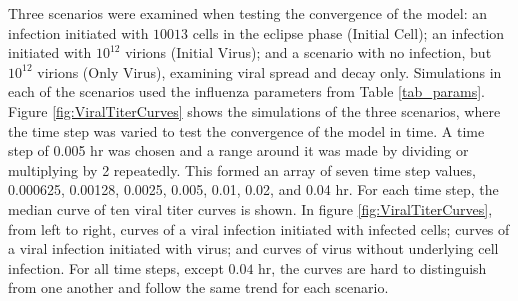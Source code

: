 Three scenarios were examined when testing the convergence of the model: an infection initiated with $10013$ cells in the eclipse phase (Initial Cell); an infection initiated with $10^{12}$ virions (Initial Virus); and a scenario with no infection, but $10^{12}$ virions (Only Virus), examining viral spread and decay only. Simulations in each of the scenarios used the influenza parameters from Table \ref{tab_params}. Figure \ref{fig:ViralTiterCurves} shows the simulations of the three scenarios, where the time step was varied to test the convergence of the model in time. A time step of 0.005 hr was chosen and a range around it was made by dividing or multiplying by 2 repeatedly. This formed an array of seven time step values, 0.000625, 0.00128, 0.0025, 0.005, 0.01, 0.02, and 0.04 hr. For each time step, the median curve of ten viral titer curves is shown. In figure \ref{fig:ViralTiterCurves}, from left to right, curves of a viral infection initiated with infected cells; curves of a viral infection initiated with virus; and curves of virus without underlying cell infection. For all time steps, except $0.04$ hr, the curves are hard to distinguish from one another and follow the same trend for each scenario. 

